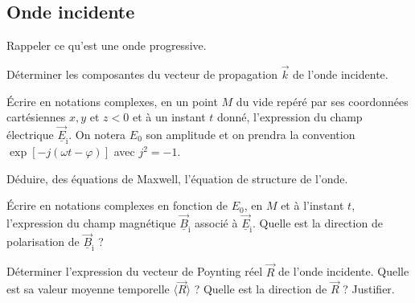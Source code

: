\subsection{Onde incidente}
\begin{quest}
    \item Rappeler ce qu'est une onde progressive.
    \item Déterminer les composantes du vecteur de propagation \(\Vec{k}\) de l'onde incidente.
    \item Écrire en notations complexes, en un point \(M\) du vide repéré par ses coordonnées cartésiennes \(x, y\) et \(z<0\) et à un instant \(t\) donné, l'expression du champ électrique \(\underline{\Vec{E}}_{\mathrm{i}}\). On notera \(E_{0}\) son amplitude et on prendra la convention \(\exp [-j(\omega t-\varphi)]\) avec \(j^{2}=-1\).
    \item Déduire, des équations de Maxwell, l'équation de structure de l'onde.
    \item Écrire en notations complexes en fonction de \(E_{0}\), en \(M\) et à l'instant \(t\), l'expression du champ magnétique \(\underline{\Vec{B}}_{\mathrm{i}}\) associé à \(\underline{\Vec{E}}_{\mathrm{i}}\). Quelle est la direction de polarisation de \(\underline{\Vec{B}}_{\mathrm{i}}\) ?
    \item Déterminer l'expression du vecteur de Poynting réel \(\Vec{R}\) de l'onde incidente. Quelle est sa valeur moyenne temporelle \(\langle\Vec{R}\rangle\) ? Quelle est la direction de \(\Vec{R}\) ? Justifier.
\end{quest}
